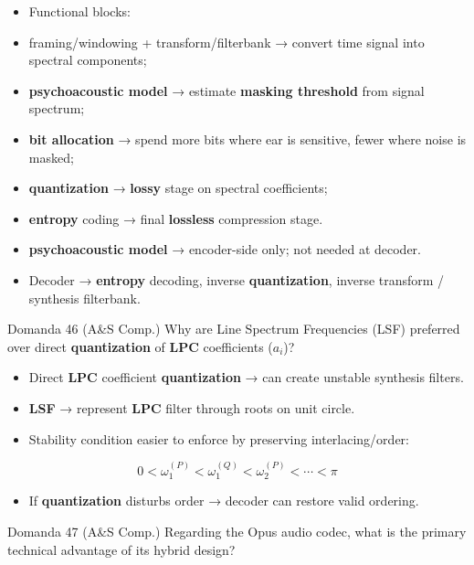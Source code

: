 \begin{itemize}
  \item Functional blocks:
  \item framing/windowing + transform/filterbank → convert time signal into spectral components;
  \item \textbf{psychoacoustic model} → estimate \textbf{masking threshold} from signal spectrum;
  \item \textbf{bit allocation} → spend more bits where ear is sensitive, fewer where noise is masked;
  \item \textbf{quantization} → \textbf{lossy} stage on spectral coefficients;
  \item \textbf{entropy} coding → final \textbf{lossless} compression stage.
  \item \textbf{psychoacoustic model} → encoder-side only; not needed at decoder.
  \item Decoder → \textbf{entropy} decoding, inverse \textbf{quantization}, inverse transform / synthesis filterbank.
\end{itemize}



\begin{questionbox}{Domanda 46}
(A\&S Comp.) Why are Line Spectrum Frequencies (LSF) preferred over direct \textbf{quantization} of \textbf{LPC} coefficients ($a_i$)?
\end{questionbox}


\begin{itemize}
  \item Direct \textbf{LPC} coefficient \textbf{quantization} → can create unstable synthesis filters.
  \item \textbf{LSF} → represent \textbf{LPC} filter through roots on unit circle.
  \item Stability condition easier to enforce by preserving interlacing/order:
\end{itemize}


$$
0<\omega_1^{(P)}<\omega_1^{(Q)}<\omega_2^{(P)}<\cdots<\pi
$$


\begin{itemize}
  \item If \textbf{quantization} disturbs order → decoder can restore valid ordering.
\end{itemize}



\begin{questionbox}{Domanda 47}
(A\&S Comp.) Regarding the Opus audio codec, what is the primary technical advantage of its hybrid design?
\end{questionbox}


